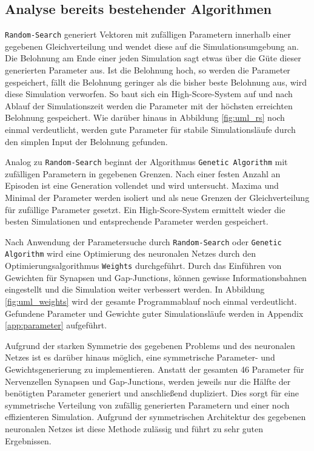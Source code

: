 	\subsection{Analyse bereits bestehender Algorithmen}
		\texttt{Random-Search} generiert Vektoren mit zufälligen Parametern innerhalb einer gegebenen Gleichverteilung und wendet diese auf die Simulationsumgebung an. Die Belohnung am Ende einer jeden Simulation sagt etwas über die Güte dieser generierten Parameter aus. Ist die Belohnung hoch, so werden die Parameter gespeichert, fällt die Belohnung geringer als die bisher beste Belohnung aus, wird diese Simulation verworfen. So baut sich ein High-Score-System auf und nach Ablauf der Simulationszeit werden die Parameter mit der höchsten erreichten Belohnung gespeichert.	Wie darüber hinaus in Abbildung \ref{fig:uml_rs} noch einmal verdeutlicht, werden gute Parameter für stabile Simulationsläufe durch den simplen Input der Belohnung gefunden.
		
		Analog zu \texttt{Random-Search} beginnt der Algorithmus \texttt{Genetic Algorithm} mit zufälligen Parametern in gegebenen Grenzen. Nach einer festen Anzahl an Episoden ist eine Generation vollendet und wird untersucht. Maxima und Minimal der Parameter werden isoliert und als neue Grenzen der Gleichverteilung für zufällige Parameter gesetzt. Ein High-Score-System ermittelt wieder die besten Simulationen und entsprechende Parameter werden gespeichert.
		
		Nach Anwendung der Parametersuche durch \texttt{Random-Search} oder \texttt{Genetic Algorithm} wird eine Optimierung des neuronalen Netzes durch den Optimierungsalgorithmus \texttt{Weights} durchgeführt. Durch das Einführen von Gewichten für Synapsen und Gap-Junctions, können gewisse Informationsbahnen eingestellt und die Simulation weiter verbessert werden. In Abbildung \ref{fig:uml_weights} wird der gesamte Programmablauf noch einmal verdeutlicht.	Gefundene Parameter und Gewichte guter Simulationsläufe werden in Appendix \ref{app:parameter} aufgeführt.
		
		Aufgrund der starken Symmetrie des gegebenen Problems und des neuronalen Netzes ist es darüber hinaus möglich, eine symmetrische Parameter- und Gewichtsgenerierung zu implementieren. Anstatt der gesamten 46 Parameter für Nervenzellen Synapsen und Gap-Junctions, werden jeweils nur die Hälfte der benötigten Parameter generiert und anschließend dupliziert. Dies sorgt für eine symmetrische Verteilung von zufällig generierten Parametern und einer noch effizienteren Simulation. Aufgrund der symmetrischen Architektur des gegebenen neuronalen Netzes ist diese Methode zulässig und führt zu sehr guten Ergebnissen.
